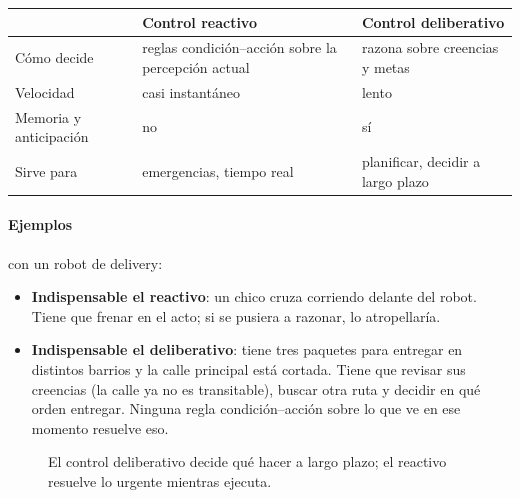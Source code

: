 \documentclass[11pt,a4paper]{article}
\begin{document}
\begin{center}
\small
\begin{tabularx}{\linewidth}{@{}l X X@{}}
\toprule
 & \textbf{Control reactivo} & \textbf{Control deliberativo} \\
\midrule
Cómo decide & reglas condición--acción sobre la percepción actual & razona sobre creencias y metas \\
Velocidad & casi instantáneo & lento \\
Memoria y anticipación & no & sí \\
Sirve para & emergencias, tiempo real & planificar, decidir a largo plazo \\
\bottomrule
\end{tabularx}
\end{center}

\paragraph{Ejemplos} con un robot de delivery:
\begin{itemize}
  \item \textbf{Indispensable el reactivo}: un chico cruza corriendo delante del robot. Tiene que frenar en el acto; si se pusiera a razonar, lo atropellaría.
  \item \textbf{Indispensable el deliberativo}: tiene tres paquetes para entregar en distintos barrios y la calle principal está cortada. Tiene que revisar sus creencias (la calle ya no es transitable), buscar otra ruta y decidir en qué orden entregar. Ninguna regla condición--acción sobre lo que ve en ese momento resuelve eso.
\end{itemize}

\begin{figure}[h]
\centering
{}
\caption{El control deliberativo decide qué hacer a largo plazo; el reactivo resuelve lo urgente mientras ejecuta.}
\end{figure}
\end{document}
